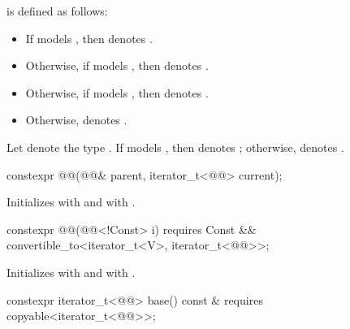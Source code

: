 \pnum
{} is defined as follows:
\begin{itemize}
\item If  models , then
 denotes .

\item Otherwise, if  models , then
 denotes .

\item Otherwise, if  models , then
 denotes .

\item Otherwise,  denotes .
\end{itemize}

\pnum
Let  denote the type
.
If  models ,
then  denotes
; otherwise,
 denotes .

\begin{itemdecl}
constexpr @@(@@& parent, iterator_t<@@> current);
\end{itemdecl}

\begin{itemdescr}
\pnum
\effects
Initializes  with  and
 with .
\end{itemdescr}

%
\begin{itemdecl}
constexpr @@(@@<!Const> i)
  requires Const && convertible_to<iterator_t<V>, iterator_t<@@>>;
\end{itemdecl}

\begin{itemdescr}
\pnum
\effects
Initializes  with  and
 with .
\end{itemdescr}

%
\begin{itemdecl}
constexpr iterator_t<@@> base() const &
  requires copyable<iterator_t<@@>>;
\end{itemdecl}

